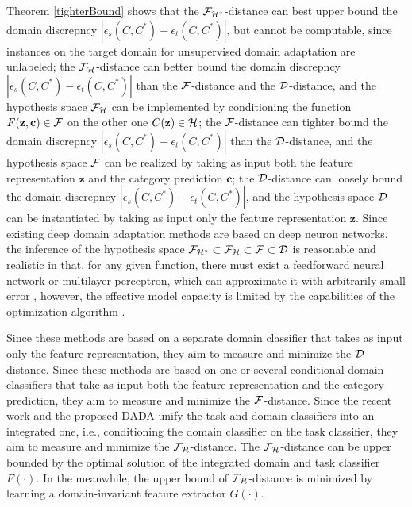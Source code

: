 \documentclass[letterpaper]{article} \usepackage{aaai20}  \usepackage{times}  \usepackage{helvet} \usepackage{courier}  \usepackage[hyphens]{url}  \usepackage{graphicx} \urlstyle{rm} \def\UrlFont{\rm}  \usepackage{graphicx}  \frenchspacing  \setlength{\pdfpagewidth}{8.5in}  \setlength{\pdfpageheight}{11in}
\begin{document}
Theorem \ref{tighterBound} shows that the ${\cal{F}}_{{\cal{H}}^*}$-distance can best upper bound the domain discrepncy $|\epsilon_s(C, C^*) - \epsilon_t(C, C^*)|$, but cannot be computable, since instances on the target domain for unsupervised domain adaptation are unlabeled; the ${\cal{F}}_{\cal{H}}$-distance can better bound the domain discrepncy $|\epsilon_s(C, C^*) - \epsilon_t(C, C^*)|$ than the $\cal{F}$-distance and the $\cal{D}$-distance, and the hypothesis space ${\cal{F}}_{\cal{H}}$ can be implemented by conditioning the function $F(\mathbf{z}, \mathbf{c}) \in \cal{F}$ on the other one $C(\mathbf{z}) \in \cal{H}$; the $\cal{F}$-distance can tighter bound the domain discrepncy $|\epsilon_s(C, C^*) - \epsilon_t(C, C^*)|$ than the $\cal{D}$-distance, and the hypothesis space $\cal{F}$ can be realized by taking as input both the feature representation $\mathbf{z}$ and the category prediction $\mathbf{c}$; the $\cal{D}$-distance can loosely bound the domain discrepncy $|\epsilon_s(C, C^*) - \epsilon_t(C, C^*)|$, and the hypothesis space $\cal{D}$ can be instantiated by taking as input only the feature representation $\mathbf{z}$. Since existing deep domain adaptation methods are based on deep neuron networks, the inference of the hypothesis space ${\cal{F}}_{{\cal{H}}^*} \subset {\cal{F}}_{\cal{H}} \subset \cal{F} \subset \cal{D}$ is reasonable and realistic in that, for any given function, there must exist a feedforward neural network or multilayer perceptron, which can approximate it with arbitrarily small error \cite{univAppTheo1,univAppTheo2}, however, the effective model capacity is limited by the capabilities of the optimization algorithm \cite{dlbook}. 

Since these methods \cite{dann,adda,SimNet,iCAN,dirt_t} are based on a separate domain classifier that takes as input only the feature representation, they aim to measure and minimize the $\cal{D}$-distance. Since these methods \cite{mada,cdan,tada,hla} are based on one or several conditional domain classifiers that take as input both the feature representation and the category prediction, they aim to measure and minimize the $\cal{F}$-distance. Since the recent work \cite{dann_ca} and the proposed DADA unify the task and domain classifiers into an integrated one, i.e., conditioning the domain classifier on the task classifier, they aim to measure and minimize the ${\cal{F}}_{\cal{H}}$-distance. The ${\cal{F}}_{\cal{H}}$-distance can be upper bounded by the optimal solution of the integrated domain and task classifier $F(\cdot)$. 
In the meanwhile, the upper bound of ${\cal{F}}_{\cal{H}}$-distance is minimized by learning a domain-invariant feature extractor $G(\cdot)$. 
\end{document}
